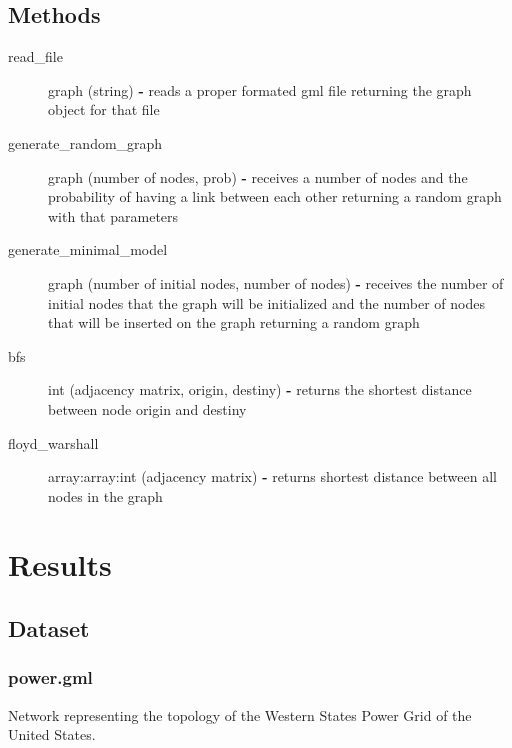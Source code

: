 \documentclass[a4paper,titlepage,11pt]{article}
\begin{document}
\subsection*{Methods}
\begin{description}
\item [read\_file] graph (string) \textbf{-} reads a proper formated gml file returning the graph object for that file
\item [generate\_random\_graph] graph (number of nodes, prob) \textbf{-} receives a number of nodes and the probability of
                                                            having a link between each other returning a random graph with that parameters
\item [generate\_minimal\_model] graph (number of initial nodes, number of nodes) \textbf{-} receives the number of initial nodes that the
 																                                 graph will be initialized and the number of nodes that will be inserted on
                                 																 the graph returning a random graph
\item [bfs] int (adjacency matrix, origin, destiny) \textbf{-} returns the shortest distance between node origin and destiny
\item [floyd\_warshall] array:array:int (adjacency matrix) \textbf{-} returns shortest distance between all nodes in the graph

\end{description}

\newpage

\section{Results}
\subsection{Dataset}
\subsubsection{power.gml}
Network representing the topology of the Western States Power Grid of the United States.
\end{document}
